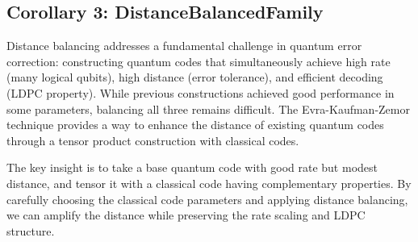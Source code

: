 \documentclass[11pt]{article}
\theoremstyle{plain}
\theoremstyle{definition}
\theoremstyle{remark}
\begin{document}
\vspace{1em}

\medskip
\noindent{}
\medskip

\subsection{Corollary 3: DistanceBalancedFamily}

Distance balancing addresses a fundamental challenge in quantum error correction: constructing quantum codes that simultaneously achieve high rate (many logical qubits), high distance (error tolerance), and efficient decoding (LDPC property). While previous constructions achieved good performance in some parameters, balancing all three remains difficult. The Evra-Kaufman-Zemor technique provides a way to enhance the distance of existing quantum codes through a tensor product construction with classical codes.

The key insight is to take a base quantum code with good rate but modest distance, and tensor it with a classical code having complementary properties. By carefully choosing the classical code parameters and applying distance balancing, we can amplify the distance while preserving the rate scaling and LDPC structure.
\end{document}

